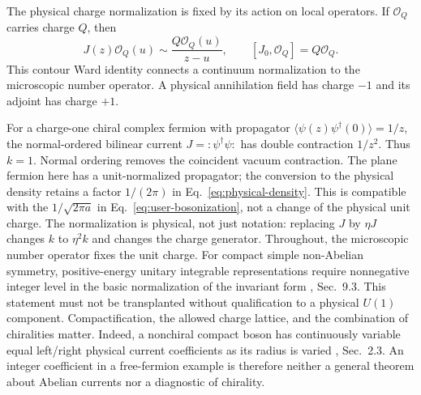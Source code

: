 \documentclass[aps,prb,onecolumn,nofootinbib,superscriptaddress]{revtex4-2}
\begin{document}
The physical charge normalization is fixed by its action on local
operators. If $\mathcal O_Q$ carries charge $Q$, then
\begin{equation}
 J(z)\mathcal O_Q(u)\sim\frac{Q\mathcal O_Q(u)}{z-u},
 \qquad [J_0,\mathcal O_Q]=Q\mathcal O_Q.
 \label{eq:charge-ward}
\end{equation}
This contour Ward identity connects a continuum normalization to the
microscopic number operator. A physical annihilation field has charge
$-1$ and its adjoint has charge $+1$.

For a charge-one chiral complex fermion with propagator
$\langle\psi(z)\psi^\dagger(0)\rangle=1/z$, the normal-ordered bilinear
current $J=:\!\psi^\dagger\psi\!:$ has double contraction $1/z^2$.
Thus $k=1$. Normal ordering removes the coincident vacuum contraction.
The plane fermion here has a unit-normalized propagator; the conversion
to the physical density retains a factor $1/(2\pi)$ in
Eq.~\eqref{eq:physical-density}. This is compatible with the
$1/\sqrt{2\pi a}$ in Eq.~\eqref{eq:user-bosonization}, not a change
of the physical unit charge.
The normalization is physical, not just notation: replacing $J$ by
$\eta J$ changes $k$ to $\eta^2 k$ and changes the charge generator.
Throughout, the microscopic number operator fixes the unit charge.
For compact simple non-Abelian symmetry, positive-energy unitary
integrable representations require nonnegative integer level in the
basic normalization of the invariant form
\cite{Ginsparg1989}, Sec.~9.3. This statement must not be transplanted
without qualification to a physical $U(1)$ component. Compactification,
the allowed charge lattice, and the combination of chiralities matter.
Indeed, a nonchiral compact boson has continuously variable equal
left/right physical current coefficients as its radius is varied
\cite{BenjaminOoguriShaoWang2020}, Sec.~2.3. An integer coefficient in a
free-fermion example is therefore neither a general theorem about
Abelian currents nor a diagnostic of chirality.
\end{document}
